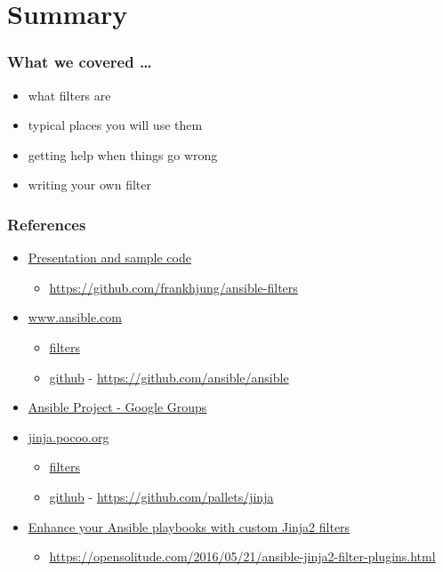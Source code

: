 \documentclass[pdf]{beamer}
\begin{document}
\section{Summary}

\begin{frame}
  \frametitle{What we covered \ldots}
    \pause{}
  \begin{itemize}[<+->]
    \item{what filters are}
    \item{typical places you will use them}
    \item{getting help when things go wrong}
    \item{writing your own filter}
  \end{itemize}
\end{frame}

\begin{frame}
  \frametitle{References}
  \begin{itemize}
    \item
      \href{https://github.com/frankhjung/ansible-filters}{Presentation and sample code}
      \begin{itemize}
        \item \url{https://github.com/frankhjung/ansible-filters}
      \end{itemize}
    \item
      \href{https://www.ansible.com/}{www.ansible.com}
      \begin{itemize}
        \item \href{http://docs.ansible.com/ansible/playbooks_filters.html}{filters}
        \item \href{https://github.com/ansible/ansible}{github} - \url{https://github.com/ansible/ansible}
      \end{itemize}
    \item
      \href{https://groups.google.com/d/forum/ansible-project}{Ansible Project - Google Groups}
    \item
      \href{http://jinja.pocoo.org/}{jinja.pocoo.org}
      \begin{itemize}
        \item \href{http://jinja.pocoo.org/docs/2.9/templates}{filters}
        \item \href{https://github.com/pallets/jinja}{github} - \url{https://github.com/pallets/jinja}
      \end{itemize}
    \item
      \href{https://opensolitude.com/2016/05/21/ansible-jinja2-filter-plugins.html}{Enhance your Ansible playbooks with custom Jinja2 filters}
      \begin{itemize}
        \item \url{https://opensolitude.com/2016/05/21/ansible-jinja2-filter-plugins.html}
      \end{itemize}
  \end{itemize}
\end{frame}
\end{document}
